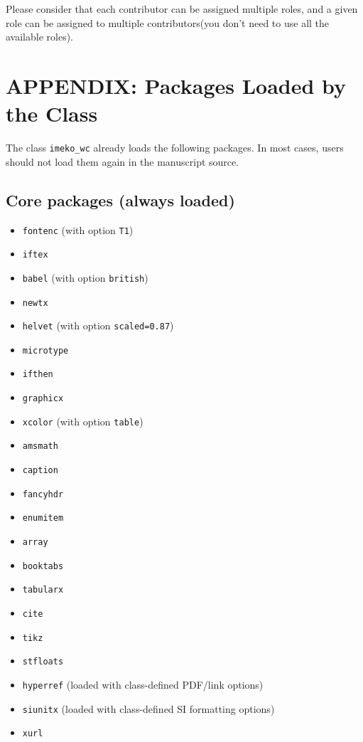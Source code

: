 \documentclass{imeko_wc}
\begin{document}
Please consider that each contributor can be assigned
multiple roles, and a given role can be assigned to multiple
contributors(you don't need to use all the available roles).

\nocite{*}



\newpage

\appendix
\section{APPENDIX: Packages Loaded by the Class}

The class \verb|imeko_wc| already loads the following packages. In most cases, users should not load them again in the manuscript source.

\subsection{Core packages (always loaded)}
\begin{itemize}
\item \verb|fontenc| (with option \verb|T1|)
\item \verb|iftex|
\item \verb|babel| (with option \verb|british|)
\item \verb|newtx|
\item \verb|helvet| (with option \verb|scaled=0.87|)
\item \verb|microtype|
\item \verb|ifthen|
\item \verb|graphicx|
\item \verb|xcolor| (with option \verb|table|)
\item \verb|amsmath|
\item \verb|caption|
\item \verb|fancyhdr|
\item \verb|enumitem|
\item \verb|array|
\item \verb|booktabs|
\item \verb|tabularx|
\item \verb|cite|
\item \verb|tikz|
\item \verb|stfloats|
\item \verb|hyperref| (loaded with class-defined PDF/link options)
\item \verb|siunitx| (loaded with class-defined SI formatting options)
\item \verb|xurl|
\end{itemize}
\end{document}
